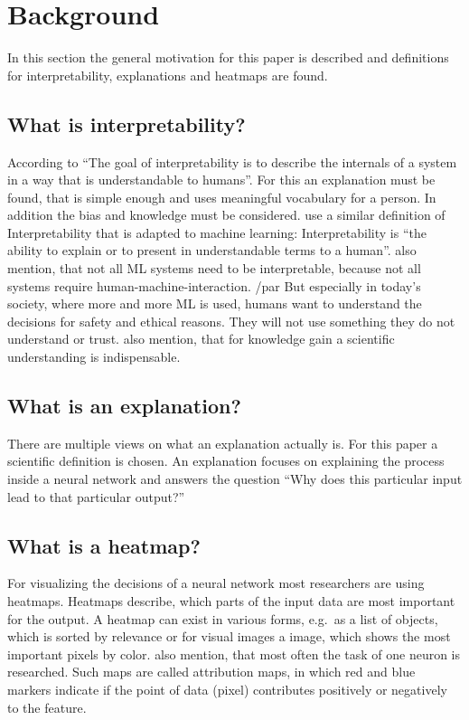 \section{Background}
In this section the general motivation for this paper is described and definitions for interpretability, explanations and heatmaps are found.

\subsection{What is interpretability?}
According to  “The goal of interpretability is to describe the internals of a system in a way that is understandable to humans”. For this an explanation must be found, that is simple enough and uses meaningful vocabulary for a person. In addition the bias and knowledge must be considered.
 use a similar definition of Interpretability that is adapted to machine learning: Interpretability is “the ability to explain or to present in understandable terms to a human”.  also mention, that not all ML systems need to be interpretable, because not all systems require human-machine-interaction. 
/par
But especially in today's society, where more and more ML is used, humans want to understand the decisions for safety and ethical reasons. They will not use something they do not understand or trust.
 also mention, that for knowledge gain a scientific understanding is indispensable.

\subsection{What is an explanation?}
There are multiple views on what an explanation actually is. For this paper a scientific definition is chosen. An explanation focuses on explaining the process inside a neural network and answers the question “Why does this particular input lead to that particular output?”~\cite[2]{Gilpin.2018}

\subsection{What is a heatmap?} 
For visualizing the decisions of a neural network most researchers are using heatmaps. Heatmaps describe, which parts of the input data are most important for the output. A heatmap can exist in various forms, e.g.\ as a list of objects, which is sorted by relevance or for visual images a image, which shows the most important pixels by color. \Cite{Acona.2018} also mention, that most often the task of one neuron is researched. Such maps are called attribution maps, in which red and blue markers indicate if the point of data (pixel) contributes positively or negatively to the feature.
